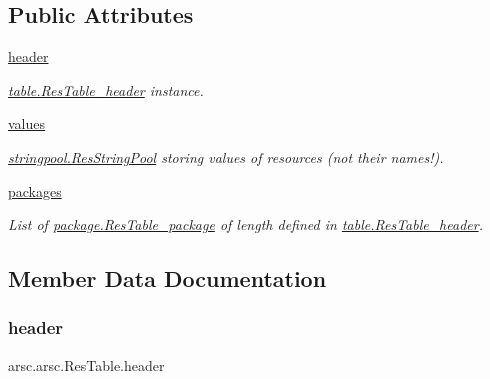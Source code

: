 \subsection*{Public Attributes}
\begin{DoxyCompactItemize}
\item 
\mbox{\hyperlink{classarsc_1_1arsc_1_1ResTable_aa11889a78793f6d29ad4a7ad35301812}{header}}
\begin{DoxyCompactList}\small\item\em \mbox{\hyperlink{classarsc_1_1table_1_1ResTable__header}{table.\+Res\+Table\+\_\+header}} instance. \end{DoxyCompactList}\item 
\mbox{\hyperlink{classarsc_1_1arsc_1_1ResTable_aacbd5386807f5b39a7492bd182eb2319}{values}}
\begin{DoxyCompactList}\small\item\em \mbox{\hyperlink{classarsc_1_1stringpool_1_1ResStringPool}{stringpool.\+Res\+String\+Pool}} storing values of resources (not their names!). \end{DoxyCompactList}\item 
\mbox{\hyperlink{classarsc_1_1arsc_1_1ResTable_aac70a39feb4e7ead6bfce81cb4057a9d}{packages}}
\begin{DoxyCompactList}\small\item\em List of \mbox{\hyperlink{classarsc_1_1package_1_1ResTable__package}{package.\+Res\+Table\+\_\+package}} of length defined in \mbox{\hyperlink{classarsc_1_1table_1_1ResTable__header}{table.\+Res\+Table\+\_\+header}}. \end{DoxyCompactList}\end{DoxyCompactItemize}


\subsection{Member Data Documentation}
\mbox{\label{classarsc_1_1arsc_1_1ResTable_aa11889a78793f6d29ad4a7ad35301812}} 
\subsubsection{\texorpdfstring{header}{header}}
{\footnotesize\ttfamily arsc.\+arsc.\+Res\+Table.\+header}



